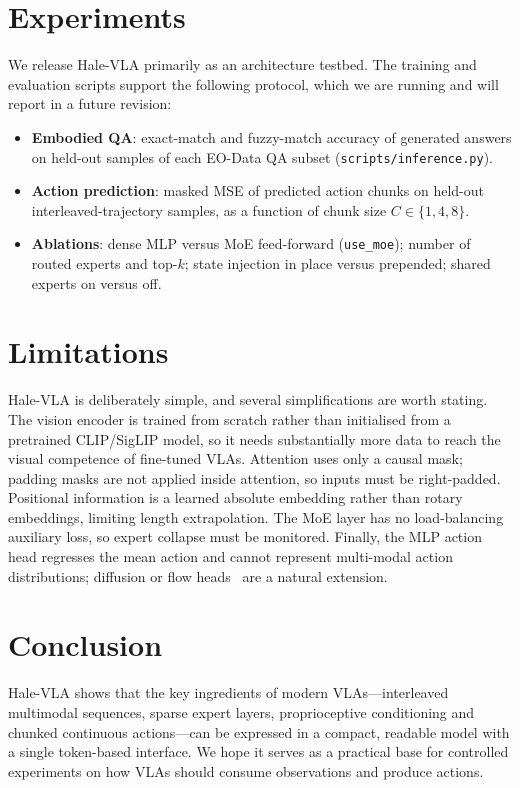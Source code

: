 \documentclass[11pt]{article}
\begin{document}
\section{Experiments}

We release Hale-VLA primarily as an architecture testbed. The training and evaluation
scripts support the following protocol, which we are running and will report in a future
revision:
\begin{itemize}
  \item \textbf{Embodied QA}: exact-match and fuzzy-match accuracy of generated answers on
        held-out samples of each EO-Data QA subset (\texttt{scripts/inference.py}).
  \item \textbf{Action prediction}: masked MSE of predicted action chunks on held-out
        interleaved-trajectory samples, as a function of chunk size $C\in\{1,4,8\}$.
  \item \textbf{Ablations}: dense MLP versus MoE feed-forward (\texttt{use\_moe}); number
        of routed experts and top-$k$; state injection in place versus prepended; shared
        experts on versus off.
\end{itemize}

\section{Limitations}

Hale-VLA is deliberately simple, and several simplifications are worth stating. The vision
encoder is trained from scratch rather than initialised from a pretrained CLIP/SigLIP model,
so it needs substantially more data to reach the visual competence of fine-tuned VLAs.
Attention uses only a causal mask; padding masks are not applied inside attention, so inputs
must be right-padded. Positional information is a learned absolute embedding rather than
rotary embeddings, limiting length extrapolation. The MoE layer has no load-balancing
auxiliary loss, so expert collapse must be monitored. Finally, the MLP action head regresses
the mean action and cannot represent multi-modal action distributions; diffusion or flow
heads~\cite{octo2024,black2024pi0} are a natural extension.

\section{Conclusion}

Hale-VLA shows that the key ingredients of modern VLAs---interleaved multimodal sequences,
sparse expert layers, proprioceptive conditioning and chunked continuous actions---can be
expressed in a compact, readable model with a single token-based interface. We hope it
serves as a practical base for controlled experiments on how VLAs should consume
observations and produce actions.



\end{document}
